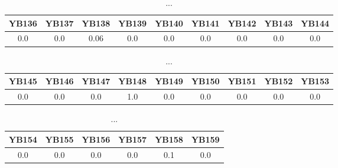 \documentclass[]{article}
\begin{document}
\begin{table}[h]
      \centering
      \begin{tabular}{|c|c|c|c|c|c|c|c|c|}
            \hline
            YB136 & YB137 & YB138 & YB139 & YB140 & YB141 & YB142 & YB143 & YB144 \\
            \hline
            0.0   & 0.0   & 0.06  & 0.0   & 0.0   & 0.0   & 0.0   & 0.0   & 0.0   \\
            \hline
      \end{tabular}
      \caption{...}
\end{table}
\begin{table}[h]
      \centering
      \begin{tabular}{|c|c|c|c|c|c|c|c|c|}
            \hline
            YB145 & YB146 & YB147 & YB148 & YB149 & YB150 & YB151 & YB152 & YB153 \\
            \hline
            0.0   & 0.0   & 0.0   & 1.0   & 0.0   & 0.0   & 0.0   & 0.0   & 0.0   \\
            \hline
      \end{tabular}
      \caption{...}
\end{table}
\begin{table}[h]
      \centering
      \begin{tabular}{|c|c|c|c|c|c|}
            \hline
            YB154 & YB155 & YB156 & YB157 & YB158 & YB159 \\
            \hline
            0.0   & 0.0   & 0.0   & 0.0   & 0.1   & 0.0   \\
            \hline
      \end{tabular}
      \caption{...}
\end{table}
\end{document}
